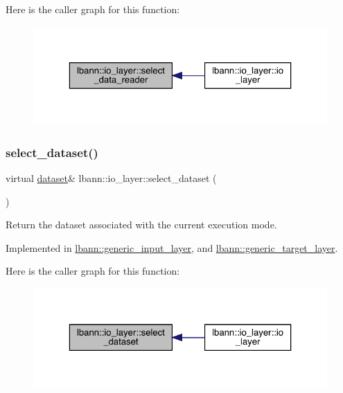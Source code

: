 Here is the caller graph for this function\+:\nopagebreak
\begin{figure}[H]
\begin{center}
\leavevmode
\includegraphics[width=323pt]{classlbann_1_1io__layer_aed46cd991ff11bad08933dc61492e26f_icgraph}
\end{center}
\end{figure}
\mbox{\label{classlbann_1_1io__layer_a66acbfb9c03a2e89a751b420416ae3bf}} 
\subsubsection{\texorpdfstring{select\+\_\+dataset()}{select\_dataset()}\hspace{0.1cm}{\footnotesize\ttfamily [1/2]}}
{\footnotesize\ttfamily virtual \hyperlink{classlbann_1_1dataset}{dataset}\& lbann\+::io\+\_\+layer\+::select\+\_\+dataset (\begin{DoxyParamCaption}{ }\end{DoxyParamCaption})\hspace{0.3cm}{\ttfamily [pure virtual]}}

Return the dataset associated with the current execution mode. 

Implemented in \hyperlink{classlbann_1_1generic__input__layer_a654365ee97a64c75a547cfb7ef329304}{lbann\+::generic\+\_\+input\+\_\+layer}, and \hyperlink{classlbann_1_1generic__target__layer_a0008630554477f39ad5ec950bf803876}{lbann\+::generic\+\_\+target\+\_\+layer}.

Here is the caller graph for this function\+:\nopagebreak
\begin{figure}[H]
\begin{center}
\leavevmode
\includegraphics[width=323pt]{classlbann_1_1io__layer_a66acbfb9c03a2e89a751b420416ae3bf_icgraph}
\end{center}
\end{figure}
\mbox{\label{classlbann_1_1io__layer_abbbeb6ca3e1d95b5c35dd9bb499bdd2d}} 

